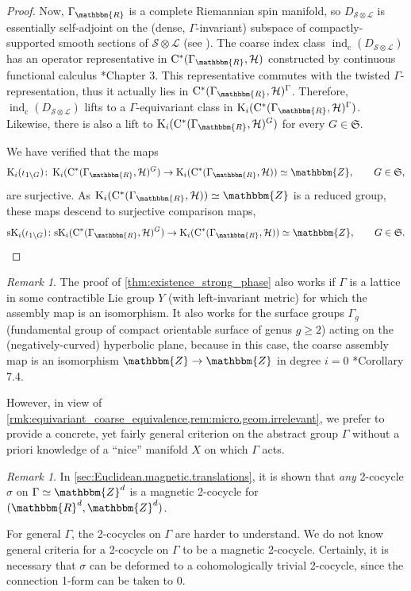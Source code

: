\documentclass{amsart}
\numberwithin{figure}{section}
\numberwithin{equation}{section}
\numberwithin{table}{section}
\theoremstyle{plain}
\theoremstyle{definition}
\theoremstyle{remark}
\newtheorem{remark}[equation]{Remark}
\theoremstyle{nonumber}
\newcommand{\Z}{\mathbb{Z}}
\newcommand{\R}{\mathbb{R}}
\newcommand{\K}{\relax\ifmmode\operatorname{K}\else\textup{K}\fi}
\newcommand{\Cst}{\relax\ifmmode\mathrm{C}^*\else\textup{C*}\fi}
\newcommand{\ind}{\operatorname{ind}} %
\renewcommand{\mathbb}{\mathbbm} %
\begin{document}
\begin{proof}
Now, $\Gamma_\R$ is a complete Riemannian spin manifold, so
$D_{\mathcal{S}\otimes\mathcal{L}}$ is essentially self-adjoint on the
(dense, $\Gamma$-invariant) subspace of compactly-supported smooth sections
of $\mathcal{S}\otimes\mathcal{L}$ (see
\cite{Wolf:Essential_self-adjointness}). The coarse index
class $\ind_\mathrm{c}(D_{\mathcal{S}\otimes\mathcal{L}})$ has an operator
representative in $\Cst(\Gamma_\R,\mathcal{H})$ constructed by
continuous functional calculus
\cite{Roe:Index_theory_coarse_geometry}*{Chapter 3}. This representative
commutes with the twisted $\Gamma$-representation, thus it actually lies in
$\Cst(\Gamma_\R,\mathcal{H})^\Gamma$. Therefore,
$\ind_\mathrm{c}(D_{\mathcal{S}\otimes\mathcal{L}})$ lifts to a
$\Gamma$-equivariant class in
\( \K_i(\Cst(\Gamma_\R,\mathcal{H})^\Gamma) \). Likewise, there is also a
lift to \( \K_i(\Cst(\Gamma_\R,\mathcal{H})^G) \) for every
$G\in\mathfrak{S}$.

We have verified that the maps
\[
\K_i(\iota_{1\backslash G})\colon \K_i(\Cst(\Gamma_\R,\mathcal{H})^G)\to \K_i(\Cst(\Gamma_\R,\mathcal{H}))\simeq\Z,\qquad G\in\mathfrak{S},
\]
are surjective. As $\K_i(\Cst(\Gamma_\R,\mathcal{H}))\simeq\Z$ is a reduced group, these maps descend to surjective comparison maps,
\[
{\rm sK}_i(\iota_{1\backslash G})\colon {\rm
sK}_i(\Cst(\Gamma_\R,\mathcal{H})^G)\to
\K_i(\Cst(\Gamma_\R,\mathcal{H}))\simeq\Z,\qquad G\in\mathfrak{S}.\qedhere
\]
\end{proof}


\begin{remark}\label{rem:other.examples.surjective.comparison}
The proof of \cref{thm:existence_strong_phase} also works if $\Gamma$ is a
lattice in some contractible Lie group $Y$ (with left-invariant metric) for
which the assembly map is an isomorphism. It also works for the surface
groups $\Gamma_g$ (fundamental group of compact orientable surface of genus
$g\geq 2$) acting on the (negatively-curved) hyperbolic plane, because in
this case, the coarse assembly map is an isomorphism $\Z\to\Z$ in degree
$i=0$ \cite{Higson-Roe:Coarse_Baum-Connes}*{Corollary 7.4}.

However, in view of
\cref{rmk:equivariant_coarse_equivalence,rem:micro.geom.irrelevant}, we
prefer to provide a concrete,
yet fairly general criterion on the abstract group $\Gamma$ without a
priori knowledge of a ``nice'' manifold $X$ on which $\Gamma$ acts. 
\end{remark}

\begin{remark}
In \cref{sec:Euclidean.magnetic.translations}, it is shown that \emph{any} 2-cocycle $\sigma$ on $\Gamma\simeq\Z^d$ is a magnetic 2-cocycle for $(\R^d,\Z^d)$.

For general $\Gamma$, the 2-cocycles on $\Gamma$ are harder to understand. We do not know general criteria for a 2-cocycle on $\Gamma$ to be a magnetic 2-cocycle. Certainly, it is necessary that $\sigma$ can be deformed to a cohomologically trivial 2-cocycle, since the connection 1-form can be taken to 0. 
\end{remark}
\end{document}
